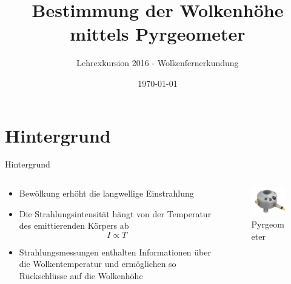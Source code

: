 \documentclass{beamer}
\title{Bestimmung der Wolkenhöhe mittels Pyrgeometer}
\author{Lehrexkursion 2016 - Wolkenfernerkundung}
\date{\today}
\begin{document}
\begin{frame}
\titlepage
\end{frame}

\section{Hintergrund}
\begin{frame}{Hintergrund}
\begin{columns}
\begin{column}{0.6\textwidth}
\begin{itemize}
  \vfill\item Bewölkung erhöht die langwellige Einstrahlung
  \vfill\item Die Strahlungsintensität hängt von der Temperatur des emittierenden Körpers ab \[ I \propto T\]
  \vfill\item Strahlungsmessungen enthalten Informationen über die Wolkentemperatur
              und ermöglichen so Rückschlüsse auf die Wolkenhöhe
  \vfill
\end{itemize}
\end{column}

\begin{column}{0.4\textwidth}
\begin{figure}[ht]
    \centering
    \includegraphics[width=1\textwidth]{figures/pyrgeometer.png}
    \caption{Pyrgeometer}
    \label{fig:pyrgeometer}
\end{figure}
\end{column}
\end{columns}
\end{frame}
\end{document}
